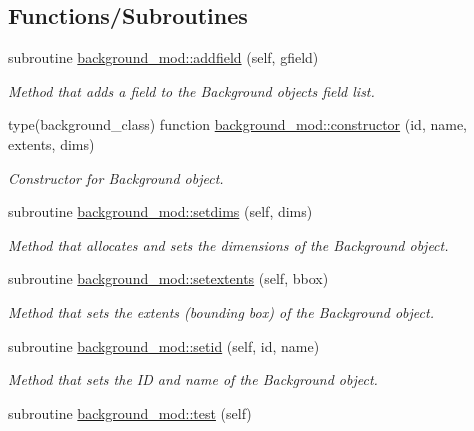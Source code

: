 \subsection*{Functions/\+Subroutines}
\begin{DoxyCompactItemize}
\item 
subroutine \mbox{\hyperlink{namespacebackground__mod_aa6ddc308698724f00ce1177ded5afc4c}{background\+\_\+mod\+::addfield}} (self, gfield)
\begin{DoxyCompactList}\small\item\em Method that adds a field to the Background object\textquotesingle{}s field list. \end{DoxyCompactList}\item 
type(background\+\_\+class) function \mbox{\hyperlink{namespacebackground__mod_ad0096fb6a5a11854fd70a7ce58dc3000}{background\+\_\+mod\+::constructor}} (id, name, extents, dims)
\begin{DoxyCompactList}\small\item\em Constructor for Background object. \end{DoxyCompactList}\item 
subroutine \mbox{\hyperlink{namespacebackground__mod_a06d96d4627391d74feb105a842a87dc0}{background\+\_\+mod\+::setdims}} (self, dims)
\begin{DoxyCompactList}\small\item\em Method that allocates and sets the dimensions of the Background object. \end{DoxyCompactList}\item 
subroutine \mbox{\hyperlink{namespacebackground__mod_ae8871564866fdd657a25f6a5a2256c33}{background\+\_\+mod\+::setextents}} (self, bbox)
\begin{DoxyCompactList}\small\item\em Method that sets the extents (bounding box) of the Background object. \end{DoxyCompactList}\item 
subroutine \mbox{\hyperlink{namespacebackground__mod_a4feaccf688558d8590ece4f09c65c977}{background\+\_\+mod\+::setid}} (self, id, name)
\begin{DoxyCompactList}\small\item\em Method that sets the ID and name of the Background object. \end{DoxyCompactList}\item 
subroutine \mbox{\hyperlink{namespacebackground__mod_a3cee95b9b5d3aae83df33334981f2b27}{background\+\_\+mod\+::test}} (self)

\end{DoxyCompactItemize}
